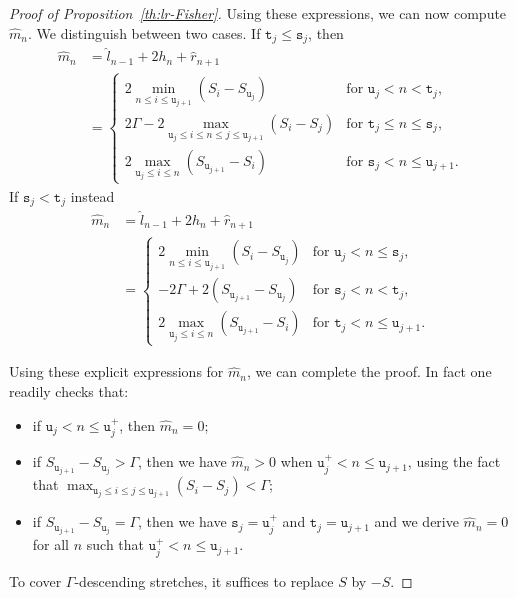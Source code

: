 \documentclass[10pt]{amsart}
\theoremstyle{definition}\newtheorem{defi}[theo]{Definition}\newtheorem{rema}[theo]{Remark}\newtheorem{exam}[theo]{Example}\newtheorem{exem}[theo]{Example}\newtheorem{nota}[theo]{Notation}
\newcommand{\gG}{\Gamma}
\renewcommand*\ss{\mathtt{u}}
\newcommand{\ttt}{\mathtt{t}}
\newcommand{\tu}{\ss}
\newcommand{\ts}{\mathtt{s}}
\newcommand{\ls}{\widehat{l}}
\newcommand{\rs}{\widehat{r}}
\newcommand{\ms}{\widehat{m}}
\begin{document}
\begin{proof}[Proof of Proposition~\ref{th:lr-Fisher}]
Using these expressions, we can now compute $\ms_n$. We distinguish between two cases. If $\ttt_j\le\ts_j$, then
\begin{equation}\label{eq:<case}
\begin{aligned}
\ms_n &= \ls_{n-1}+2h_n+\rs_{n+1}\\
 &=
\begin{cases}
2\min_{n\le i\le \tu_{j+1}} \left(S_i - S_{\tu_j}\right) & \text{for } \tu_j < n< \ttt_j, \\
2\gG - 2\max_{\tu_j\le i\le n \le j \le \tu_{j+1}} \left(S_i-S_j\right) & \text{for } \ttt_j \le n \le \ts_j, \\
2 \max_{\tu_j\le i\le n} \left(S_{\tu_{j+1}}-S_i \right) & \text{for } \ts_j < n \le \tu_{j+1}.
\end{cases}
\end{aligned}
\end{equation}
If $\ts_j<\ttt_j$ instead
\begin{equation}\label{eq:>case}
\begin{aligned}
\ms_n &= \ls_{n-1}+2h_n+\rs_{n+1}\\
&=
\begin{cases}
2\min_{n\le i\le \tu_{j+1}} \left(S_i - S_{\tu_j}\right) & \text{for } \tu_j < n \le \ts_j, \\
-2\gG + 2\left(S_{\tu_{j+1}}-S_{\tu_j}\right) & \text{for } \ts_j < n < \ttt_j, \\
2 \max_{\tu_j\le i\le n} \left(S_{\tu_{j+1}}-S_i \right) & \text{for } \ttt_j < n \le \tu_{j+1}.
\end{cases}
\end{aligned}
\end{equation}

Using these explicit expressions for $\ms_n$, we can complete the proof. In fact one readily checks that:
\begin{itemize}
\item if $\tu_j< n \le \tu_j^+$, then $\ms_n=0$;
\item if $S_{\tu_{j+1}}-S_{\tu_j}>\gG$, then we have $\ms_n>0$ when $\tu_j^+<n\le \tu_{j+1}$, using the fact that $\max_{\tu_j\le i \le j \le \tu_{j+1}} \left(S_i-S_j\right) < \gG$;
\item if $S_{\tu_{j+1}}-S_{\tu_j}=\gG$, then we have $\ts_j=\tu_j^+$ and $\ttt_j=\tu_{j +1}$ and we derive $\ms_n=0$ for all $n$ such that $\tu_j^+<n\le \tu_{j+1}$.
\end{itemize}

To cover $\gG$-descending stretches, it suffices to replace $S$ by $-S$.
\end{proof}
\end{document}
